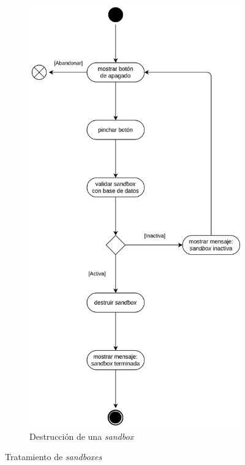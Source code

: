 \begin{figure}[h]
                \hfill
                \begin{subfigure}{0.45\textwidth}
                    \centering
                    \includegraphics[scale=0.13]{images/Diagramas/Actividades y transiciones 5.png}
                    \caption{Destrucción de una \textit{sandbox}}
                    \label{fig:destruccion-sandbox}
                \end{subfigure}
                \caption{Tratamiento de \textit{sandboxes}}
                \label{fig:tratamiento-sandboxes}
            \end{figure}
            
